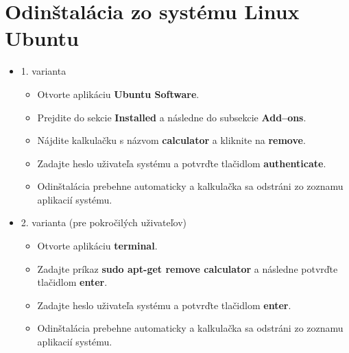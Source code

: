 \documentclass[11pt, a4paper]{article}
\begin{document}
    \section*{Odinštalácia zo systému Linux Ubuntu}
    \begin{itemize}
        \item 1. varianta
        \begin{itemize}
            \item Otvorte aplikáciu \textbf{Ubuntu Software}.
            \item Prejdite do sekcie \textbf{Installed} a následne do subsekcie  \textbf{Add--ons}.
            \item Nájdite kalkulačku s názvom \textbf{calculator} a kliknite na \textbf{remove}.
            \item Zadajte heslo uživateľa systému a potvrďte tlačidlom \textbf{authenticate}.
            \item Odinštalácia prebehne automaticky a kalkulačka sa odstráni zo zoznamu aplikacií systému.
        \end{itemize}
        \item 2. varianta (pre pokročilých uživateľov)
        \begin{itemize}
            \item Otvorte aplikáciu \textbf{terminal}.
            \item Zadajte príkaz \textbf{sudo apt-get remove calculator} a následne potvrďte tlačidlom \textbf{enter}.
            \item Zadajte heslo uživateľa systému a potvrďte tlačidlom \textbf{enter}.
            \item Odinštalácia prebehne automaticky a kalkulačka sa odstráni zo zoznamu aplikacií systému.
        \end{itemize}
    \end{itemize}
    \newpage
\end{document}
